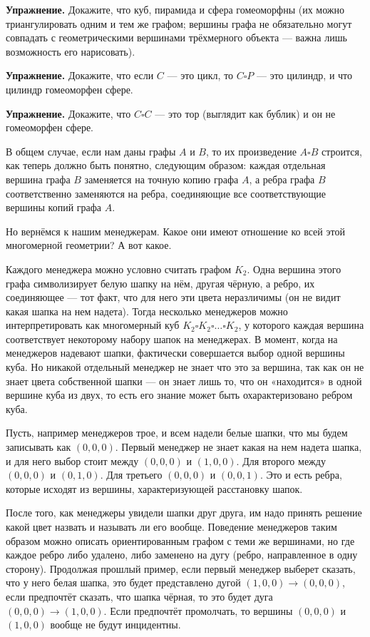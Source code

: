 {\bfseries Упражнение.} Докажите, что куб, пирамида и сфера гомеоморфны (их можно триангулировать одним и тем же графом; вершины графа не обязательно могут совпадать с геометрическими вершинами трёхмерного объекта — важна лишь возможность его нарисовать).

{\bfseries Упражнение.} Докажите, что если $C$ — это цикл, то $C\square P$ — это цилиндр, и что цилиндр гомеоморфен сфере.

{\bfseries Упражнение.} Докажите, что $C\square C$ — это тор (выглядит как бублик) и он не гомеоморфен сфере.

В общем случае, если нам даны графы $A$ и $B$, то их произведение $A\square B$ строится, как теперь должно быть понятно, следующим образом: каждая отдельная вершина графа $B$ заменяется на точную копию графа $A$, а ребра графа $B$ соответственно заменяются на ребра, соединяющие все соответствующие вершины копий графа $A$.

Но вернёмся к нашим менеджерам. Какое они имеют отношение ко всей этой многомерной геометрии? А вот какое.

Каждого менеджера можно условно считать графом $K_2$. Одна вершина этого графа символизирует белую шапку на нём, другая чёрную, а ребро, их соединяющее — тот факт, что для него эти цвета неразличимы (он не видит какая шапка на нем надета). Тогда несколько менеджеров можно интерпретировать как многомерный куб $K_2 \square K_2 \square \ldots \square K_2$, у которого каждая вершина соответствует некоторому набору шапок на менеджерах. В момент, когда на менеджеров надевают шапки, фактически совершается выбор одной вершины куба. Но никакой отдельный менеджер не знает что это за вершина, так как он не знает цвета собственной шапки — он знает лишь то, что он «находится» в одной вершине куба из двух, то есть его знание может быть охарактеризовано ребром куба.

Пусть, например менеджеров трое, и всем надели белые шапки, что мы будем записывать как $(0, 0, 0)$. Первый менеджер не знает какая на нем надета шапка, и для него выбор стоит между $(0, 0, 0)$ и $(1, 0, 0)$. Для второго между $(0, 0, 0)$ и $(0, 1, 0)$. Для третьего $(0, 0, 0)$ и $(0, 0, 1)$. Это и есть ребра, которые исходят из вершины, характеризующей расстановку шапок.

После того, как менеджеры увидели шапки друг друга, им надо принять решение какой цвет назвать и называть ли его вообще. Поведение менеджеров таким образом можно описать ориентированным графом с теми же вершинами, но где каждое ребро либо удалено, либо заменено на дугу (ребро, направленное в одну сторону). Продолжая прошлый пример, если первый менеджер выберет сказать, что у него белая шапка, это будет представлено дугой $(1,0,0)\to (0, 0, 0)$, если предпочтёт сказать, что шапка чёрная, то это будет дуга $(0, 0, 0)\to (1, 0,0)$. Если предпочтёт промолчать, то вершины $(0, 0, 0)$ и $(1, 0, 0)$ вообще не будут инцидентны.

